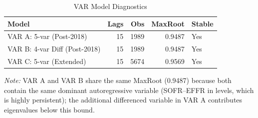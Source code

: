 \begin{table}[htbp]
\centering
\caption{VAR Model Diagnostics} 
\label{tab:var_diagnostics}
\begin{tabular}{lrrrl}
  \toprule
Model & Lags & Obs & MaxRoot & Stable \\ 
  \midrule
VAR A: 5-var (Post-2018) & 15 & 1989 & 0.9487 & Yes \\ 
  VAR B: 4-var Diff (Post-2018) & 15 & 1989 & 0.9487 & Yes \\ 
  VAR C: 5-var (Extended) & 15 & 5674 & 0.9569 & Yes \\ 
   \bottomrule
\end{tabular}
\vspace{0.5em}
\footnotesize\textit{Note:} VAR A and VAR B share the same MaxRoot (0.9487) because both contain the same dominant autoregressive variable (SOFR--EFFR in levels, which is highly persistent); the additional differenced variable in VAR A contributes eigenvalues below this bound.
\end{table}
